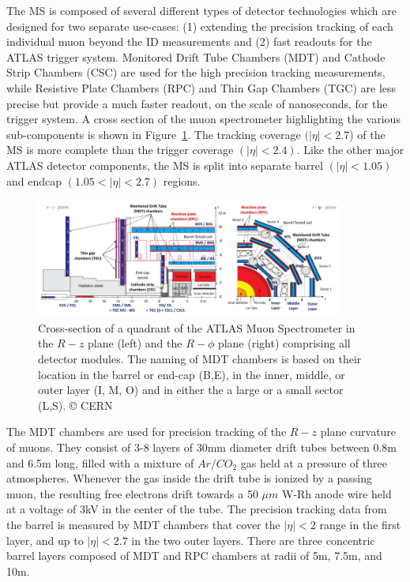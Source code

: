 The MS is composed of several different types of detector technologies which are designed for two separate use-cases: (1) extending the precision tracking of each individual muon beyond the ID measurements and (2) fast readouts for the ATLAS trigger system.
Monitored Drift Tube Chambers (MDT) and Cathode Strip Chambers (CSC) are used for the high precision tracking measurements, while Resistive Plate Chambers (RPC) and Thin Gap Chambers (TGC) are less precise but provide a much faster readout, on the scale of nanoseconds, for the trigger system.
A cross section of the muon spectrometer highlighting the various sub-components is shown in Figure~\ref{fig:muon_spectrometer_cross_section}.
The tracking coverage $(|\eta| < 2.7$) of the MS is more complete than the trigger coverage $(|\eta| < 2.4)$.
Like the other major ATLAS detector components, the MS is split into separate barrel $(|\eta| < 1.05)$ and endcap $(1.05 < |\eta| < 2.7)$ regions.

\begin{figure}
	\centering
	\includegraphics[width=0.9\textwidth]{muon_spectrometer_quadrant}
	\caption{
	 Cross-section of a quadrant of the ATLAS Muon Spectrometer \cite{kuger2017signal} in the $R-z$ plane (left) and the $R-\phi$ plane (right) comprising all detector modules. The naming of MDT chambers is based on their location in the barrel or end-cap (B,E), in the inner, middle, or outer layer (I, M, O) and in either the a large or a small sector (L,S).
	 © CERN
	}
	\label{fig:muon_spectrometer_cross_section}
\end{figure}

The MDT chambers are used for precision tracking of the $R-z$ plane curvature of muons.
They consist of 3-8 layers of 30mm diameter drift tubes between 0.8m and 6.5m long, filled with a mixture of $Ar/CO_2$ gas held at a pressure of three atmospheres.
Whenever the gas inside the drift tube is ionized by a passing muon, the resulting free electrons drift towards a 50 $\mu m$ W-Rh anode wire held at a voltage of 3kV in the center of the tube.
The precision tracking data from the barrel is measured by MDT chambers that cover the $|\eta| < 2$ range in the first layer, and up to $|\eta| < 2.7$ in the two outer layers.
There are three concentric barrel layers composed of MDT and RPC chambers at radii of 5m, 7.5m, and 10m.

